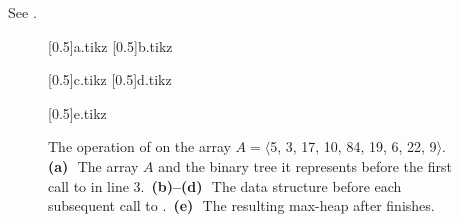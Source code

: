 See .
\begin{figure}[htb]
    \subcaptionbox{\label{fig:6.3-1a}}[0.5\textwidth]{{a.tikz}}
    \subcaptionbox{\label{fig:6.3-1b}}[0.5\textwidth]{{b.tikz}}
    \par\vspace{1.5\vertexsize}
    \subcaptionbox{\label{fig:6.3-1c}}[0.5\textwidth]{{c.tikz}}
    \subcaptionbox{\label{fig:6.3-1d}}[0.5\textwidth]{{d.tikz}}
    \par\vspace{1.5\vertexsize}
    \subcaptionbox{\label{fig:6.3-1e}}[0.5\textwidth]{{e.tikz}}
    \caption{The operation of  on the array $A=\langle$5, 3, 17, 10, 84, 19, 6, 22, 9$\rangle$.\,
    \textbf{(a)}\,~The array $A$ and the binary tree it represents before the first call to  in line 3.\,
    \textbf{(b)--(d)}\,~The data structure before each subsequent call to .\,
    \textbf{(e)}\,~The resulting max-heap after  finishes.} \label{fig:6.3-1}
\end{figure}
